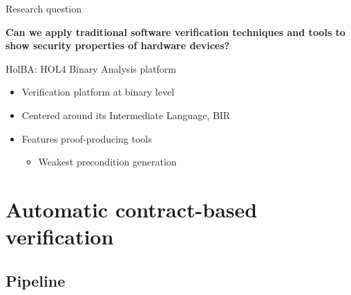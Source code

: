 \documentclass[xcolor={x11names}]{beamer}
\begin{document}
\begin{frame}{Research question}
    \begin{center}
        \textbf{Can we apply traditional software verification techniques and tools to show security properties of hardware devices?}
    \end{center}
\end{frame}

\begin{frame}{HolBA: HOL4 Binary Analysis platform}
    \begin{itemize}%
        \item Verification platform at binary level
        \item Centered around its Intermediate Language, BIR
        \item Features proof-producing tools
              \begin{itemize}
                  \item Weakest precondition generation
              \end{itemize}
    \end{itemize}
\end{frame}


\section{Automatic contract-based verification}

\subsection{Pipeline}
\end{document}
